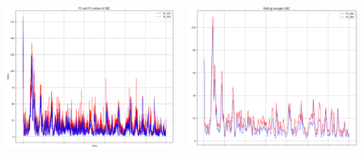 \documentclass[18pt]{beamer}
\begin{document}
\begin{frame}
  \begin{columns}
    \begin{column}{0.5\textwidth}
      \includegraphics[scale=0.2]{images/SBC_1}
    \end{column}
    \begin{column}{0.5\textwidth}
      \includegraphics[scale=0.2]{images/SBC_2}
    \end{column}
  \end{columns}

\end{frame}
\end{document}
